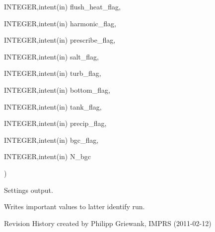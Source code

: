 {{\begin{DoxyParamCaption}
\item[{INTEGER,intent(in)}]{ flush\_\-heat\_\-flag, }
\item[{INTEGER,intent(in)}]{ harmonic\_\-flag, }
\item[{INTEGER,intent(in)}]{ prescribe\_\-flag, }
\item[{INTEGER,intent(in)}]{ salt\_\-flag, }
\item[{INTEGER,intent(in)}]{ turb\_\-flag, }
\item[{INTEGER,intent(in)}]{ bottom\_\-flag, }
\item[{INTEGER,intent(in)}]{ tank\_\-flag, }
\item[{INTEGER,intent(in)}]{ precip\_\-flag, }
\item[{INTEGER,intent(in)}]{ bgc\_\-flag, }
\item[{INTEGER,intent(in)}]{ N\_\-bgc}
\end{DoxyParamCaption}
)}}
\label{namespacemo__output_a9d48b3b49e6dbe858e06c8fe1dc4bfbd}


Settings output. 

Writes important values to latter identify run.

\begin{DoxyParagraph}{Revision History}
created by Philipp Griewank, IMPRS (2011-\/02-\/12) 
\end{DoxyParagraph}
